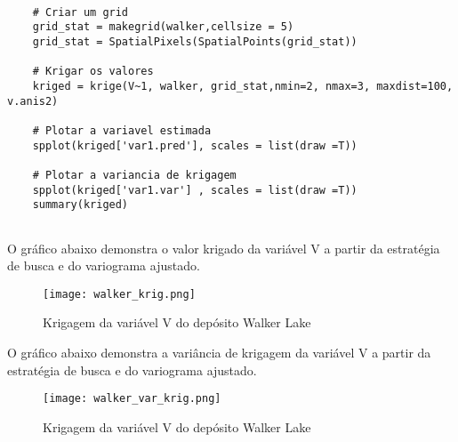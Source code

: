 \begin{scriptsize}
	\estiloR
	\begin{lstlisting}[caption={Criação de um vetor em R}, label=lst:rcode]
	
	# Criar um grid 
	grid_stat = makegrid(walker,cellsize = 5)
	grid_stat = SpatialPixels(SpatialPoints(grid_stat))
		
	# Krigar os valores
	kriged = krige(V~1, walker, grid_stat,nmin=2, nmax=3, maxdist=100, v.anis2)
	
	# Plotar a variavel estimada
	spplot(kriged['var1.pred'], scales = list(draw =T))
	
	# Plotar a variancia de krigagem
	spplot(kriged['var1.var'] , scales = list(draw =T))
	summary(kriged)
	
	\end{lstlisting}
\end{scriptsize}

O gráfico abaixo demonstra o valor krigado da variável V a partir da estratégia de busca e do variograma ajustado.

\FloatBarrier
\begin{figure}[H]
	\centering
	\texttt{[image: walker\_krig.png]}	
	\caption{Krigagem da variável V do depósito Walker Lake}
	\label{walk}
\end{figure}
\FloatBarrier

O gráfico abaixo demonstra a variância de krigagem da variável V a partir da estratégia de busca e do variograma ajustado.

\FloatBarrier
\begin{figure}[H]
	\centering
	\texttt{[image: walker\_var\_krig.png]}	
	\caption{Krigagem da variável V do depósito Walker Lake}
	\label{walk}
\end{figure}
\FloatBarrier
